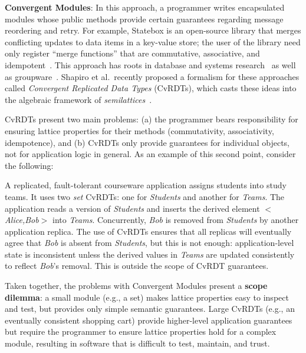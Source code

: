 \vspace{0.5em}\noindent
\textbf{Convergent Modules}: In this approach, a programmer writes encapsulated
modules whose public methods provide certain guarantees regarding message
reordering and retry. For example, Statebox is an open-source library that
merges conflicting updates to data items in a key-value store; the user of the
library need only register ``merge functions'' that are commutative,
associative, and idempotent~\cite{statebox}. This approach has roots in database
and systems research~\cite{Farrag1989,Garcia-Molina1983,Helland2009,O'Neil1986,Terry1995} as
well as groupware~\cite{Ellis1989,Sun1998}.  Shapiro et al.\ recently proposed a
formalism for these approaches called \emph{Convergent Replicated Data Types}
(CvRDTs), which casts these ideas into the algebraic framework of
\emph{semilattices}~\cite{Shapiro2011a,Shapiro2011b}.

CvRDTs present two main problems: (a) the programmer bears responsibility for
ensuring lattice properties for their methods (commutativity, associativity,
idempotence), and (b) CvRDTs only provide guarantees for individual objects, not
for application logic in general. As an example of this second point, consider
the following:

\vspace{-0.25em}
\begin{example}
A replicated, fault-tolerant courseware application assigns students into study teams.  It uses two \emph{set} CvRDTs: one for \emph{Students} and another for \emph{Teams}.  The application reads a version of \emph{Students} and inserts the derived element $<$\emph{Alice,Bob}$>$ into \emph{Teams}. Concurrently, \emph{Bob} is removed from
\emph{Students} by another application replica. The use of CvRDTs ensures that all replicas will
eventually agree that \emph{Bob} is absent from \emph{Students}, but this is not enough: application-level state
is inconsistent unless the derived values in \emph{Teams} are updated consistently to reflect \emph{Bob}'s
removal.  This is outside the scope of CvRDT guarantees.
\end{example}

\vspace{-.25em}
Taken together, the problems with Convergent Modules present a {\bf scope
  dilemma}: a small module (e.g., a set) makes lattice properties easy to
inspect and test, but provides only simple semantic guarantees. Large CvRDTs
(e.g., an eventually consistent shopping cart) provide higher-level application
guarantees but require the programmer to ensure lattice properties hold for a
complex module, resulting in software that is difficult to test, maintain, and
trust.
% 

